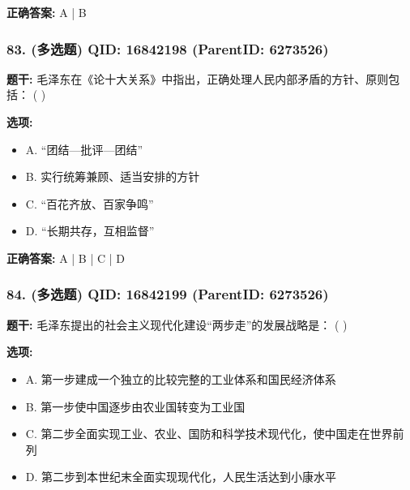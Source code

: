 \documentclass[12pt,UTF8]{ctexart}
\begin{document}
\textbf{正确答案:}
A | B

\vspace{0.3em}\hrulefill\vspace{0.7em}

\subsubsection*{83. (多选题) \small QID: 16842198 (ParentID: 6273526)}

\textbf{题干:}
毛泽东在《论十大关系》中指出，正确处理人民内部矛盾的方针、原则包括： ( )



\textbf{选项:}
\begin{itemize}[leftmargin=*]

  \item A. “团结—批评—团结”

  \item B. 实行统筹兼顾、适当安排的方针

  \item C. “百花齐放、百家争鸣”

  \item D. “长期共存，互相监督”

\end{itemize}

\textbf{正确答案:}
A | B | C | D

\vspace{0.3em}\hrulefill\vspace{0.7em}

\subsubsection*{84. (多选题) \small QID: 16842199 (ParentID: 6273526)}

\textbf{题干:}
毛泽东提出的社会主义现代化建设“两步走”的发展战略是： ( )



\textbf{选项:}
\begin{itemize}[leftmargin=*]

  \item A. 第一步建成一个独立的比较完整的工业体系和国民经济体系

  \item B. 第一步使中国逐步由农业国转变为工业国

  \item C. 第二步全面实现工业、农业、国防和科学技术现代化，使中国走在世界前列

  \item D. 第二步到本世纪末全面实现现代化，人民生活达到小康水平

\end{itemize}
\end{document}
